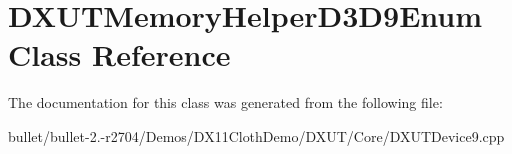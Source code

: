 \hypertarget{class_d_x_u_t_memory_helper_d3_d9_enum}{\section{D\+X\+U\+T\+Memory\+Helper\+D3\+D9\+Enum Class Reference}
\label{class_d_x_u_t_memory_helper_d3_d9_enum}
}


The documentation for this class was generated from the following file\+:\begin{DoxyCompactItemize}
\item 
bullet/bullet-\/2.-\/r2704/\+Demos/\+D\+X11\+Cloth\+Demo/\+D\+X\+U\+T/\+Core/D\+X\+U\+T\+Device9.\+cpp\end{DoxyCompactItemize}
